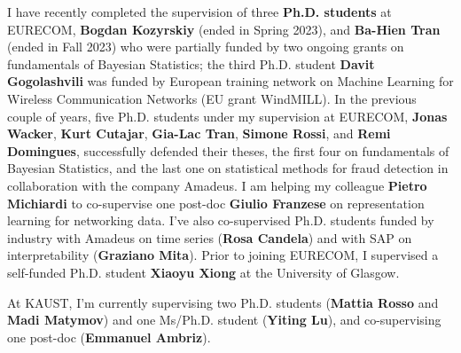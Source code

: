 \documentclass[oneside, a4paper, onecolumn, 10pt]{article}
\begin{document}
I have recently completed the supervision of three {\bf Ph.D. students} at EURECOM, {\bf Bogdan Kozyrskiy} (ended in Spring 2023), and {\bf Ba-Hien Tran} (ended in Fall 2023) who were partially funded by two ongoing grants on fundamentals of Bayesian Statistics; the third Ph.D. student {\bf Davit Gogolashvili} was funded by European training network on Machine Learning for Wireless Communication Networks (EU grant WindMILL).
In the previous couple of years, five Ph.D. students under my supervision at EURECOM, {\bf Jonas Wacker}, {\bf Kurt Cutajar}, {\bf Gia-Lac Tran}, {\bf Simone Rossi}, and {\bf Remi Domingues}, successfully defended their theses, the first four on fundamentals of Bayesian Statistics, and the last one on statistical methods for fraud detection in collaboration with the company Amadeus. %
I am helping my colleague {\bf Pietro Michiardi} to co-supervise one post-doc {\bf Giulio Franzese} on representation learning for networking data.
I've also co-supervised Ph.D. students funded by industry with Amadeus on time series ({\bf Rosa Candela}) and with SAP on interpretability ({\bf Graziano Mita}). %
Prior to joining EURECOM, I supervised a self-funded Ph.D. student {\bf Xiaoyu Xiong} at the University of Glasgow.

At KAUST, I'm currently supervising two Ph.D. students ({\bf Mattia Rosso} and {\bf Madi Matymov}) and one Ms/Ph.D. student ({\bf Yiting Lu}), and co-supervising one post-doc ({\bf Emmanuel Ambriz}).


\end{document}
